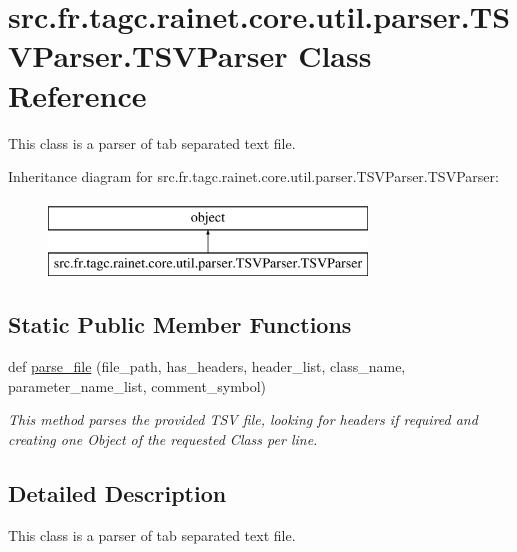 \hypertarget{classsrc_1_1fr_1_1tagc_1_1rainet_1_1core_1_1util_1_1parser_1_1TSVParser_1_1TSVParser}{}\section{src.\+fr.\+tagc.\+rainet.\+core.\+util.\+parser.\+T\+S\+V\+Parser.\+T\+S\+V\+Parser Class Reference}
\label{classsrc_1_1fr_1_1tagc_1_1rainet_1_1core_1_1util_1_1parser_1_1TSVParser_1_1TSVParser}


This class is a parser of tab separated text file.  


Inheritance diagram for src.\+fr.\+tagc.\+rainet.\+core.\+util.\+parser.\+T\+S\+V\+Parser.\+T\+S\+V\+Parser\+:\begin{figure}[H]
\begin{center}
\leavevmode
\includegraphics[height=2.000000cm]{classsrc_1_1fr_1_1tagc_1_1rainet_1_1core_1_1util_1_1parser_1_1TSVParser_1_1TSVParser}
\end{center}
\end{figure}
\subsection*{Static Public Member Functions}
\begin{DoxyCompactItemize}
\item 
def \hyperlink{classsrc_1_1fr_1_1tagc_1_1rainet_1_1core_1_1util_1_1parser_1_1TSVParser_1_1TSVParser_a88be88273475e14a025143245a1067c6}{parse\+\_\+file} (file\+\_\+path, has\+\_\+headers, header\+\_\+list, class\+\_\+name, parameter\+\_\+name\+\_\+list, comment\+\_\+symbol)
\begin{DoxyCompactList}\small\item\em This method parses the provided T\+S\+V file, looking for headers if required and creating one Object of the requested Class per line. \end{DoxyCompactList}\end{DoxyCompactItemize}


\subsection{Detailed Description}
This class is a parser of tab separated text file. 

